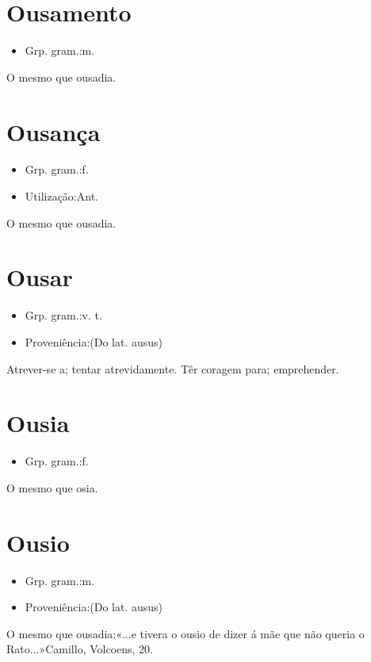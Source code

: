 \section{Ousamento}
\begin{itemize}
\item {Grp. gram.:m.}
\end{itemize}
O mesmo que \textunderscore ousadia\textunderscore .
\section{Ousança}
\begin{itemize}
\item {Grp. gram.:f.}
\end{itemize}
\begin{itemize}
\item {Utilização:Ant.}
\end{itemize}
O mesmo que \textunderscore ousadia\textunderscore .
\section{Ousar}
\begin{itemize}
\item {Grp. gram.:v. t.}
\end{itemize}
\begin{itemize}
\item {Proveniência:(Do lat. \textunderscore ausus\textunderscore )}
\end{itemize}
Atrever-se a; tentar atrevidamente.
Têr coragem para; emprehender.
\section{Ousia}
\begin{itemize}
\item {Grp. gram.:f.}
\end{itemize}
O mesmo que \textunderscore osia\textunderscore .
\section{Ousio}
\begin{itemize}
\item {Grp. gram.:m.}
\end{itemize}
\begin{itemize}
\item {Proveniência:(Do lat. \textunderscore ausus\textunderscore )}
\end{itemize}
O mesmo que \textunderscore ousadia\textunderscore :«\textunderscore ...e tivera o ousio de dizer á mãe que não queria o Rato...\textunderscore »Camillo, \textunderscore Volcoens\textunderscore , 20.
